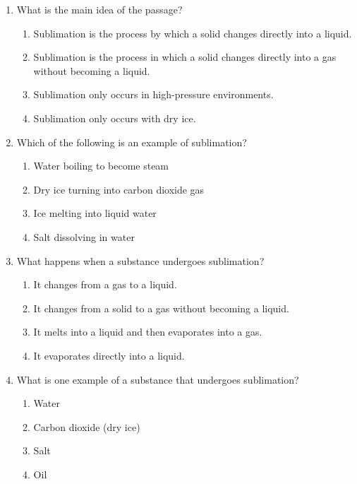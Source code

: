 \documentclass[12pt]{article}
\begin{document}
\begin{enumerate}

\item What is the main idea of the passage?
\begin{enumerate}[label=\Alph*.]
    \item Sublimation is the process by which a solid changes directly into a liquid.
    \item Sublimation is the process in which a solid changes directly into a gas without becoming a liquid.
    \item Sublimation only occurs in high-pressure environments.
    \item Sublimation only occurs with dry ice.
\end{enumerate}

\vspace{0.5cm}

\item Which of the following is an example of sublimation?
\begin{enumerate}[label=\Alph*.]
    \item Water boiling to become steam
    \item Dry ice turning into carbon dioxide gas
    \item Ice melting into liquid water
    \item Salt dissolving in water
\end{enumerate}

\vspace{0.5cm}

\item What happens when a substance undergoes sublimation?
\begin{enumerate}[label=\Alph*.]
    \item It changes from a gas to a liquid.
    \item It changes from a solid to a gas without becoming a liquid.
    \item It melts into a liquid and then evaporates into a gas.
    \item It evaporates directly into a liquid.
\end{enumerate}

\vspace{0.5cm}

\item What is one example of a substance that undergoes sublimation?
\begin{enumerate}[label=\Alph*.]
    \item Water
    \item Carbon dioxide (dry ice)
    \item Salt
    \item Oil
\end{enumerate}


\end{enumerate}
\end{document}
